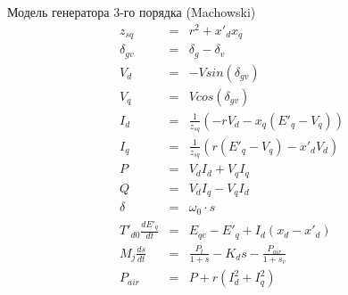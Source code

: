 \documentclass[]{article}
\begin{document}
Модель генератора 3-го порядка (Machowski)
\renewcommand*{\arraystretch}{1.8}
\begin{equation}
\begin{array}{rcl}
z_{sq} & = & r^2+x'_dx_q  \\
\delta_{gv} &=& \delta_{g} - \delta_{v} \\
V_d & = & -Vsin(\delta_{gv}) \\
V_q & = & Vcos(\delta_{gv}) \\
I_d & = & \frac{1}{z_{sq}}(-rV_d - x_q(E'_q - V_q)) \\
I_q & = & \frac{1}{z_{sq}}(r(E'_q - V_q) - x'_dV_d ) \\
P   & = & V_dI_d + V_qI_q  \\
Q   & = & V_dI_q - V_qI_d \\
\delta & = & \omega_0\cdot s  \\ 
T'_{d0}\frac{dE'_q}{dt}  & = & E_{qe} - E'_q + I_d(x_d - x'_d) \\
M_j\frac{ds}{dt} & = & \frac{P_t}{1+s} - K_{d}s - \frac{P_{air}}{1+s_v}  \\
P_{air} & = & P + r(I_d^2+I_q^2) \\
\end{array}
\end{equation}
\end{document}
